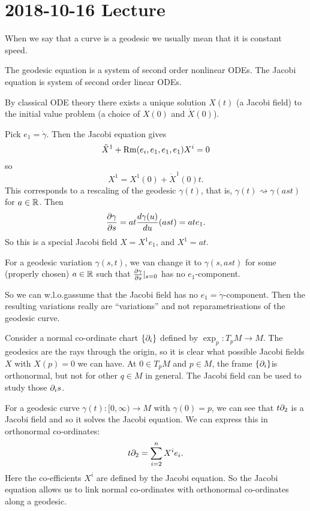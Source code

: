 \section{2018-10-16 Lecture}

\begin{rmk}
  When we say that a curve is a geodesic we usually mean that it is constant speed.
\end{rmk}

\begin{rmk}
  The geodesic equation is a system of second order nonlinear ODEs.
  The Jacobi equation is system of second order linear ODEs.
\end{rmk}

By classical ODE theory there exists a unique solution $X(t)$ (a Jacobi field) to the initial value problem (a choice of $X(0)$ and $\dot{X}(0)$). 

\begin{rmk}[4.5]
  Pick $e_1=\dot\gamma$.
  Then the Jacobi equation gives
  \[ \ddot{X}^1 + \operatorname{Rm}(e_i,e_1,e_1,e_1)X^i = 0 \]
  so
  \[ X^1 = X^1(0) + \dot{X}^1(0)t. \]
  This corresponds to a rescaling of the geodesic $\gamma(t)$, that is, $\gamma(t) \rightsquigarrow \gamma(ast)$ for $a\in\mathbb{R}$.
  Then
  \[ \frac{\partial\gamma}{\partial s} = at \frac{d\gamma(u)}{du}(ast) = ate_1. \]
  So this is a special Jacobi field $X=X^1e_1$, and $X^1=at$.

  \begin{exer}
    For a geodesic variation $\gamma(s,t)$, we van change it to $\gamma(s,ast)$ for some (properly chosen) $a\in\mathbb{R}$ such that $\tfrac{\partial\gamma}{\partial s}|_{s=0}$ has no $e_1$-component.
  \end{exer}

  So we can w.l.o.g\@ assume that the Jacobi field has no $e_1=\dot\gamma$-component.
  Then the resulting variations really are ``variations'' and not reparametrisations of the geodesic curve.
\end{rmk}

\begin{exam}
  Consider a normal co-ordinate chart $\{\partial_i\}$ defined by $\exp_p:T_pM\to M$.
  The geodesics are the rays through the origin, so it is clear what possible Jacobi fields $X$ with $X(p)=0$ we can have.
  At $0\in T_pM$ and $p\in M$, the frame $\{\partial_i\}$is orthonormal, but not for other $q\in M$ in general.
  The Jacobi field can be used to study those $\partial_is$.

  For a geodesic curve $\gamma(t):[0,\infty)\to M$ with $\gamma(0)=p$, we can see that $t\partial_2$ is a Jacobi field and so it solves the Jacobi equation.
  We can express this in orthonormal co-ordinates:
  \[ t\partial_2 = \sum_{i=2}^n X^ie_i. \]
  Here the co-efficients $X^i$ are defined by the Jacobi equation.
  So the Jacobi equation allows us to link normal co-ordinates with orthonormal co-ordinates along a geodesic.
\end{exam}

